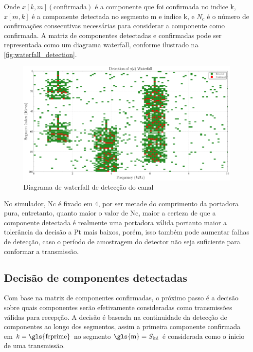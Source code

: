 \noindent Onde $x[k,m](\text{confirmada})$ é a componente que foi confirmada no indice \gls{k}, ${x}[m,k]$ é a componente detectada no segmento \gls{m} e indice \gls{k}, e $N_c$ é o número de confirmações consecutivas necessárias para considerar a componente como confirmada. A matriz de componentes detectadas e confirmadas pode ser representada como um diagrama waterfall, conforme ilustrado na \autoref{fig:waterfall_detection}.

\begin{figure}[H]
	\centering
	\caption{Diagrama de waterfall de detecção do canal}\label{fig:waterfall_detection}
	\includegraphics[width=\linewidth]{assets/cap3/example_detector_waterfall_detection.pdf}
\end{figure}

No simulador, \gls{Nc} é fixado em $4$, por ser metade do comprimento da portadora pura, entretanto, quanto maior o valor de \gls{Nc}, maior a certeza de que a componente detectada é realmente uma portadora válida portanto maior a tolerância da decisão a \gls{Pt} mais baixos, porém, isso também pode aumentar falhas de detecção, caso o período de amostragem do detector não seja suficiente para conformar a transmissão.

\subsection{Decisão de componentes detectadas}\label{sec:decisao}

Com base na matriz de componentes confirmadas, o próximo passo é a decisão sobre quais componentes serão efetivamente consideradas como transmissões válidas para recepção. A decisão é baseada na continuidade da detecção de componentes ao longo dos segmentos, assim a primeira componente confirmada em $k = \text{\gls{fcprime}}$ no segmento $\text{\gls{m}} = S_{\text{ini}}$ é considerada como o inicio de uma transmissão. 

